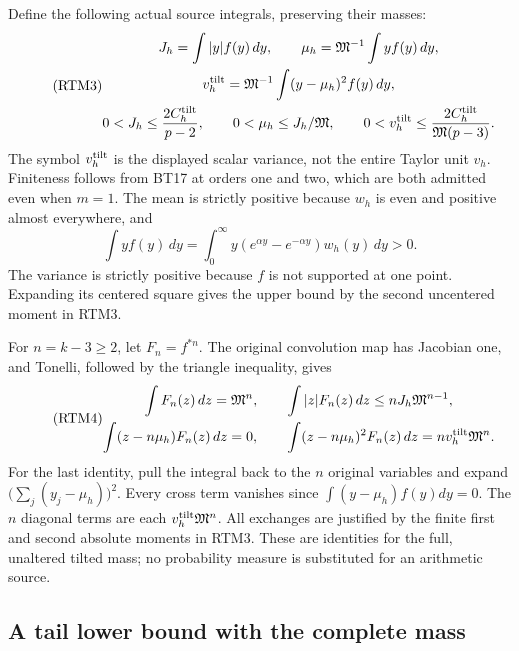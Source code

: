 \documentclass[11pt,a4paper]{article}
\begin{document}
Define the following actual source integrals, preserving their masses:
\begin{equation}\tag{RTM3}
 \begin{gathered}
 J_h=\int |y|f(y)\,dy,
 \qquad \mu_h=\mathfrak M^{-1}\int y f(y)\,dy,\\
 v_h^{\rm tilt}=\mathfrak M^{-1}
       \int(y-\mu_h)^2f(y)\,dy,\\
 0<J_h\le\frac{2C_h^{\rm tilt}}{p-2},\qquad
 0<\mu_h\le J_h/\mathfrak M,\qquad
 0<v_h^{\rm tilt}\le\frac{2C_h^{\rm tilt}}{\mathfrak M(p-3)}.
 \end{gathered}
\end{equation}
The symbol $v_h^{\rm tilt}$ is the displayed scalar variance, not the
entire Taylor unit $v_h$.  Finiteness follows from BT17 at orders one
and two, which are both admitted even when $m=1$.  The mean is strictly
positive because $w_h$ is even and positive almost everywhere, and
\[
 \int y f(y)\,dy=\int_0^\infty
 y(e^{\alpha y}-e^{-\alpha y})w_h(y)\,dy>0.
\]
The variance is strictly positive because $f$ is not supported at one
point.  Expanding its centered square gives the upper bound by the
second uncentered moment in RTM3.

For $n=k-3\ge2$, let $F_n=f^{*n}$.  The original convolution map has
Jacobian one, and Tonelli, followed by the triangle inequality, gives
\begin{equation}\tag{RTM4}
 \begin{gathered}
 \int F_n(z)\,dz=\mathfrak M^n,\qquad
 \int |z|F_n(z)\,dz\le nJ_h\mathfrak M^{n-1},\\
 \int (z-n\mu_h)F_n(z)\,dz=0,\qquad
 \int (z-n\mu_h)^2F_n(z)\,dz
       =nv_h^{\rm tilt}\mathfrak M^n.
 \end{gathered}
\end{equation}
For the last identity, pull the integral back to the $n$ original
variables and expand $\bigl(\sum_j(y_j-\mu_h)\bigr)^2$.
Every cross term vanishes since $\int(y-\mu_h)f(y)dy=0$.
The $n$ diagonal terms are each $v_h^{\rm tilt}\mathfrak M^n$.
All exchanges are justified by the finite first and second absolute
moments in RTM3.  These are identities for the full, unaltered tilted
mass; no probability measure is substituted for an arithmetic source.

\subsection{A tail lower bound with the complete mass}
\end{document}
